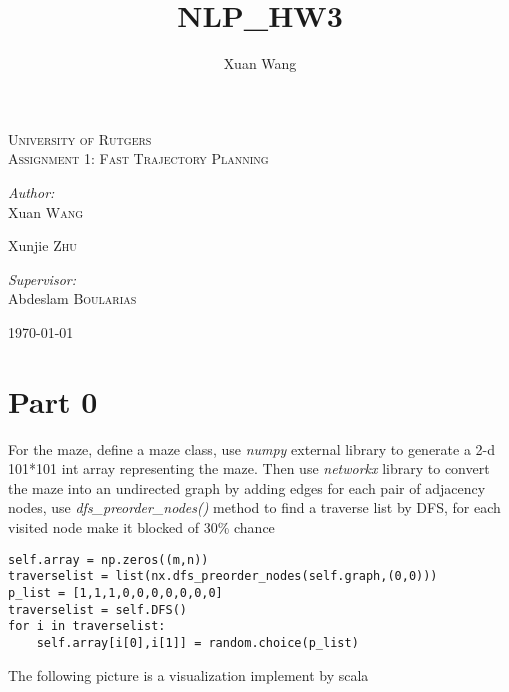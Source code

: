 \documentclass[12pt]{amsart}
\title{NLP_HW3}
\author{Xuan Wang}
\date{} %
\begin{document}
\begin{titlepage}

\begin{center}



\textsc{\LARGE University of Rutgers}\\[1.5cm]

\textsc{\Large Assignment 1: Fast Trajectory Planning}\\[0.5cm]


\begin{minipage}{0.4\textwidth}
\begin{flushleft} \large
\emph{Author:}\\
Xuan \textsc{Wang}

Xunjie \textsc{Zhu}
\end{flushleft}
\end{minipage}
\begin{minipage}{0.4\textwidth}
\begin{flushright} \large
\emph{Supervisor:} \\
Abdeslam  \textsc{Boularias}
\end{flushright}
\end{minipage}

\vfill

{\large \today}

\end{center}

\end{titlepage}

\section*{Part 0}
For the maze, define a maze class, use \emph{numpy} external library to generate a 2-d 101*101 int array representing the maze. Then use \emph{networkx} library to convert the maze into an undirected graph by adding edges for each pair of adjacency nodes, use \emph{dfs\_preorder\_nodes()} method to find a traverse list by DFS, for each visited node make it blocked of 30\% chance
\begin{lstlisting}
self.array = np.zeros((m,n))
traverselist = list(nx.dfs_preorder_nodes(self.graph,(0,0)))
p_list = [1,1,1,0,0,0,0,0,0,0]
traverselist = self.DFS()
for i in traverselist:
	self.array[i[0],i[1]] = random.choice(p_list)
\end{lstlisting}
The following picture is a visualization implement by scala
\end{document}
